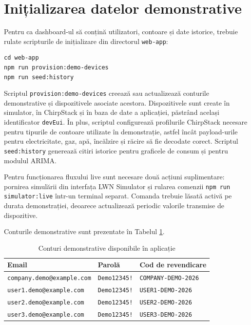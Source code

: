 \section{Inițializarea datelor demonstrative}

Pentru ca dashboard-ul să conțină utilizatori, contoare și date istorice, trebuie rulate scripturile de inițializare din directorul \texttt{web-app}:

\begin{verbatim}
cd web-app
npm run provision:demo-devices
npm run seed:history
\end{verbatim}

Scriptul \texttt{provision:demo-devices} creează sau actualizează conturile demonstrative și dispozitivele asociate acestora. Dispozitivele sunt create în simulator, în ChirpStack și în baza de date a aplicației, păstrând același identificator \texttt{devEui}. În plus, scriptul configurează profilurile ChirpStack necesare pentru tipurile de contoare utilizate în demonstrație, astfel încât payload-urile pentru electricitate, gaz, apă, încălzire și răcire să fie decodate corect. Scriptul \texttt{seed:history} generează citiri istorice pentru graficele de consum și pentru modulul ARIMA.

Pentru funcționarea fluxului live sunt necesare două acțiuni suplimentare: pornirea simulării din interfața LWN Simulator și rularea comenzii \texttt{npm run simulator:live} într-un terminal separat. Comanda trebuie lăsată activă pe durata demonstrației, deoarece actualizează periodic valorile transmise de dispozitive.

Conturile demonstrative sunt prezentate în Tabelul \ref{tab:conturi-demo}. 

\begin{table}[htbp]
\centering
\small
\begin{tabular}{|p{}|p{}|p{}|}
\hline
\textbf{Email} & \textbf{Parolă} & \textbf{Cod de revendicare} \\
\hline
\texttt{company.demo@example.com} & \texttt{Demo12345!} & \texttt{COMPANY-DEMO-2026} \\
\hline
\texttt{user1.demo@example.com} & \texttt{Demo12345!} & \texttt{USER1-DEMO-2026} \\
\hline
\texttt{user2.demo@example.com} & \texttt{Demo12345!} & \texttt{USER2-DEMO-2026} \\
\hline
\texttt{user3.demo@example.com} & \texttt{Demo12345!} & \texttt{USER3-DEMO-2026} \\
\hline
\end{tabular}
\caption{Conturi demonstrative disponibile în aplicație}
\label{tab:conturi-demo}
\end{table}

